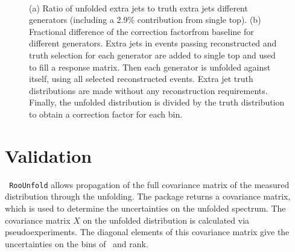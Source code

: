 \begin{center}
\begin{figure}
~
\caption{(a) Ratio of unfolded extra jets to truth extra jets different \ttbar generators (including a 2.9\% contribution from single top). (b) Fractional difference of the correction factorfrom baseline for different generators. Extra jets in events passing reconstructed and truth selection for each generator are added to single top and used to fill a response matrix. Then each generator is unfolded against itself, using all selected reconstructed events. Extra jet truth distributions are made without any reconstruction requirements. Finally, the unfolded distribution is divided by the truth distribution to obtain a correction factor for each bin.
\label{fig:bincorr}}
\end{figure}
\end{center}




\section{Validation}

\texttt{ RooUnfold} allows propagation of the full covariance matrix of the measured distribution through the unfolding. 
The package returns a covariance matrix, which is used to determine the uncertainties
on the unfolded spectrum. %
The covariance matrix $X$ on the unfolded distribution is calculated via pseudoexperiments. The diagonal elements of this covariance matrix give the uncertainties on the bins of \pt\ and rank. 

